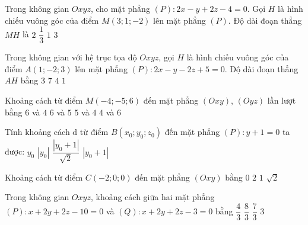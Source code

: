 \begin{ex}%
	Trong không gian $Oxyz$, cho mặt phẳng $(P)\colon 2x-y+2z-4=0$. Gọi $H$ là hình chiếu vuông góc của điểm $M\left(3;1;-2\right)$ lên mặt phẳng $(P)$. Độ dài đoạn thẳng $MH$ là
	\choice
	{$2$}
	{$\dfrac{1}{3}$}
	{\True $1$}
	{$3$}
\end{ex}

\begin{ex}%
	Trong không gian với hệ trục tọa độ $Oxyz$, gọi $H$ là hình chiếu vuông góc của điểm $A(1;-2;3)$ lên mặt phẳng $(P)\colon 2x-y-2z+5=0$. Độ dài đoạn thẳng $AH$ bằng
	\choice
	{$3$}
	{$7$}
	{$4$}
	{$1$}
\end{ex}

\begin{ex}%
	Khoảng cách từ điểm $M(-4;-5;6)$ đến mặt phẳng $(Oxy)$, $(Oyz)$ lần lượt bằng
	\choice
	{\True $6$ và $4$}
	{$6$ và $5$}
	{$5$ và $4$}
	{$4$ và $6$}
\end{ex}

\begin{ex}%
	Tính khoảng cách $\mathrm{d}$ từ điểm $B\left(x_0;y_0;z_0\right)$ đến mặt phẳng $(P)\colon y + 1 = 0$ ta được:
	\choice
	{$y_0$}
	{$\left| y_0\right|$}
	{$\dfrac{\left| y_0+1\right|}{\sqrt{2}}$}
	{\True $\left| y_0+1\right|$}
\end{ex}

\begin{ex}%
	Khoảng cách từ điểm $C(-2;0;0)$ đến mặt phẳng $(Oxy)$ bằng
	\choice
	{\True $0$}
	{$2$}
	{$1$}
	{$\sqrt{2}$}
\end{ex}

\begin{ex}%
	Trong không gian $Oxyz$, khoảng cách giữa hai mặt phẳng $(P)\colon x+2y+2z-10=0$ và $(Q)\colon x+2y+2z-3=0$ bằng
	\choice
	{$\dfrac{4}{3}$}
	{$\dfrac{8}{3}$}
	{\True $\dfrac{7}{3}$}
	{$3$}
\end{ex}

